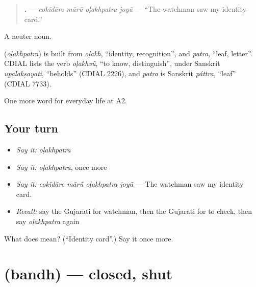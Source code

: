 \begin{quote}
\textbf{   .} — \emph{cokīdāre mārũ oḷakhpatra joyũ} — \textquotedblleft{}The watchman saw my identity card.\textquotedblright{}
\end{quote}

A neuter noun.

\begin{cousinweb}
\textbf{} (\emph{oḷakhpatra}) is built from \emph{oḷakh}, \textquotedblleft{}identity, recognition\textquotedblright{}, and \emph{patra}, \textquotedblleft{}leaf, letter\textquotedblright{}. CDIAL lists the verb \emph{oḷakhvũ}, \textquotedblleft{}to know, distinguish\textquotedblright{}, under Sanskrit \emph{upalakṣayati}, \textquotedblleft{}beholds\textquotedblright{} (CDIAL 2226), and \emph{patra} is Sanskrit \emph{páttra}, \textquotedblleft{}leaf\textquotedblright{} (CDIAL 7733).
\end{cousinweb}

\begin{grammarlens}[title={What you've built}]
One more word for everyday life at A2.
\end{grammarlens}

\subsection*{Your turn}
\begin{itemize}
\raggedright
  \item \emph{Say it:} \emph{oḷakhpatra}
  \item \emph{Say it:} \emph{oḷakhpatra}, once more
  \item \emph{Say it:} \emph{cokīdāre mārũ oḷakhpatra joyũ} — The watchman saw my identity card.
  \item \emph{Recall:} say the Gujarati for watchman, then the Gujarati for to check, then say \emph{oḷakhpatra} again
\end{itemize}

\begin{tcolorbox}[breakable,colback=teal!4,colframe=teal!35!black,title={Before you move on}]
What does  mean? (\textquotedblleft{}Identity card\textquotedblright{}.) Say it once more.
\end{tcolorbox}
\section[\texorpdfstring{\gu{બંધ} (bandh)}{બંધ (bandh)}]{ (bandh) — closed, shut}

